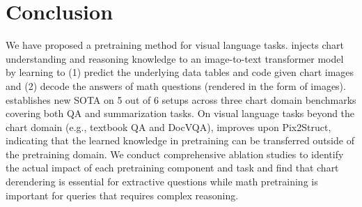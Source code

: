 \section{Conclusion}

We have proposed a pretraining method \model{} for visual language tasks. \model{} injects chart understanding and reasoning knowledge to an image-to-text transformer model by learning to (1) predict the underlying data tables and code given chart images and (2) decode the answers of math questions (rendered in the form of images). \model{} establishes new SOTA on 5 out of 6 setups across three chart domain benchmarks covering both QA and summarization tasks. On visual language tasks beyond the chart domain (e.g., textbook QA and DocVQA), \model{} improves upon Pix2Struct, indicating that the learned knowledge in \model{} pretraining can be transferred outside of the pretraining domain. We conduct comprehensive ablation studies to identify the actual impact of each pretraining component and task and find that chart derendering is essential for extractive questions while math pretraining is important for queries that requires complex reasoning.